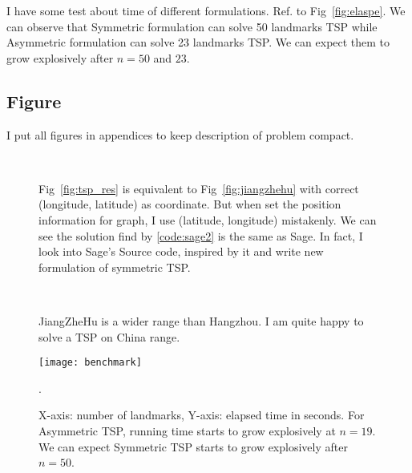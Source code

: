 \documentclass{mcmthesis}
\begin{document}
I have some test about time of different formulations. Ref. to Fig~\vref{fig:elaspe}. We can observe that Symmetric formulation can solve 50 landmarks TSP while Asymmetric formulation can solve 23 landmarks TSP. We can expect them to grow explosively after $n=50$ and $23$. 



\begin{appendices}
\section{Figure}
I put all figures in appendices to keep description of problem compact.
\begin{figure}[H]
	\centering
	 \quad  
	  \quad
	\\
	  \quad 
	\caption[Results]{Fig~\vref{fig:tsp_res} is equivalent to Fig~\vref{fig:jiangzhehu} with correct (longitude, latitude) as coordinate. But when set the position information for graph, I use (latitude, longitude) mistakenly. We can see the solution find by \vref{code:sage2} is the same as Sage. In fact, I look into Sage's Source code, inspired by it and write new  formulation of symmetric TSP.} 
\end{figure}
\begin{figure}[H]
	\centering
	 \   
	\caption[Results]{JiangZheHu is a wider range than Hangzhou. I am quite happy to solve a TSP on China range.} 
\end{figure}
\begin{figure}[H]
	\centering
	\texttt{[image: benchmark]}
	\caption[Running time]{X-axis: number of landmarks, Y-axis: elapsed time in seconds. For Asymmetric TSP, running time starts to grow explosively at $n=19$.  We can expect Symmetric TSP starts to grow explosively after $n=50$.}
	\label{fig:elaspe}.
\end{figure}

\end{appendices}
\end{document}
